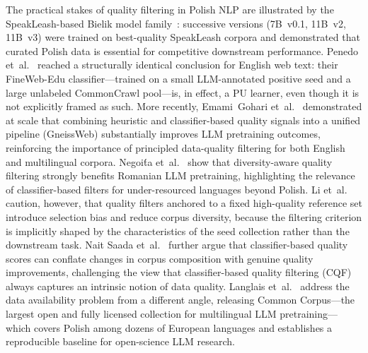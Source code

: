 \documentclass[applsci,article,accept,pdftex,moreauthors]{Definitions/mdpi}
\newcommand{\rev}[1]{{#1}}
\begin{document}
\rev{The practical stakes of quality filtering in Polish NLP are illustrated by the SpeakLeash-based Bielik model family~\cite{bielik7b,bielik11bv3,ociepa2026bielikv3tok}: successive versions (7B~v0.1, 11B~v2, 11B~v3) were trained on best-quality SpeakLeash corpora and demonstrated that curated Polish data is essential for competitive downstream performance.} Penedo et~al.~\cite{penedo2024fineweb} reached a structurally identical conclusion for English web text: their FineWeb-Edu classifier---trained on a small LLM-annotated positive seed and a large unlabeled CommonCrawl pool---is, in effect, a PU learner, even though it is not explicitly framed as such. \rev{More recently, Emami~Gohari et~al.~\cite{emami2026gneissweb} demonstrated at scale that combining heuristic and classifier-based quality signals into a unified pipeline (GneissWeb) substantially improves LLM pretraining outcomes, reinforcing the importance of principled data-quality filtering for both English and multilingual corpora.} \rev{Negoi\'{t}a et~al.~\cite{negoita2026romanianllm} show that diversity-aware quality filtering strongly benefits Romanian LLM pretraining, highlighting the relevance of classifier-based filters for under-resourced languages beyond Polish.} Li et~al.~\cite{li2024scalingfilter} caution, however, that quality filters anchored to a fixed high-quality reference set introduce selection bias and reduce corpus diversity, because the filtering criterion is implicitly shaped by the characteristics of the seed collection rather than   the downstream task. \rev{Nait Saada et~al.~\cite{saada2026cqf} further argue that classifier-based quality scores can conflate changes in corpus composition with genuine quality improvements, challenging the view that classifier-based quality filtering (CQF) always captures an intrinsic notion of data quality.} \rev{Langlais et~al.~\cite{langlais2026commoncorpus} address the data availability problem from a different angle, releasing Common Corpus---the largest open and fully licensed collection for multilingual LLM pretraining---which covers Polish among dozens of European languages and establishes a reproducible baseline for open-science LLM research.}
\end{document}
